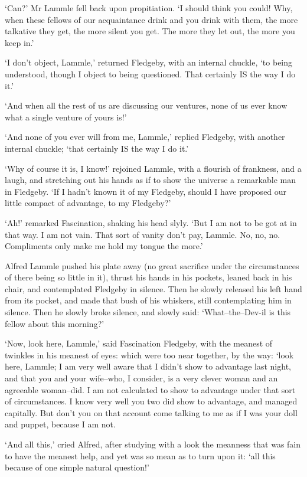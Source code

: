 ‘Can?’ Mr Lammle fell back upon propitiation. ‘I should think you could!
Why, when these fellows of our acquaintance drink and you drink with
them, the more talkative they get, the more silent you get. The more
they let out, the more you keep in.’

‘I don’t object, Lammle,’ returned Fledgeby, with an internal chuckle,
‘to being understood, though I object to being questioned. That
certainly IS the way I do it.’

‘And when all the rest of us are discussing our ventures, none of us
ever know what a single venture of yours is!’

‘And none of you ever will from me, Lammle,’ replied Fledgeby, with
another internal chuckle; ‘that certainly IS the way I do it.’

‘Why of course it is, I know!’ rejoined Lammle, with a flourish of
frankness, and a laugh, and stretching out his hands as if to show
the universe a remarkable man in Fledgeby. ‘If I hadn’t known it of my
Fledgeby, should I have proposed our little compact of advantage, to my
Fledgeby?’

‘Ah!’ remarked Fascination, shaking his head slyly. ‘But I am not to
be got at in that way. I am not vain. That sort of vanity don’t pay,
Lammle. No, no, no. Compliments only make me hold my tongue the more.’

Alfred Lammle pushed his plate away (no great sacrifice under the
circumstances of there being so little in it), thrust his hands in his
pockets, leaned back in his chair, and contemplated Fledgeby in silence.
Then he slowly released his left hand from its pocket, and made that
bush of his whiskers, still contemplating him in silence. Then he slowly
broke silence, and slowly said: ‘What--the--Dev-il is this fellow about
this morning?’

‘Now, look here, Lammle,’ said Fascination Fledgeby, with the meanest
of twinkles in his meanest of eyes: which were too near together, by
the way: ‘look here, Lammle; I am very well aware that I didn’t show to
advantage last night, and that you and your wife--who, I consider, is
a very clever woman and an agreeable woman--did. I am not calculated to
show to advantage under that sort of circumstances. I know very well you
two did show to advantage, and managed capitally. But don’t you on that
account come talking to me as if I was your doll and puppet, because I
am not.

‘And all this,’ cried Alfred, after studying with a look the meanness
that was fain to have the meanest help, and yet was so mean as to turn
upon it: ‘all this because of one simple natural question!’

